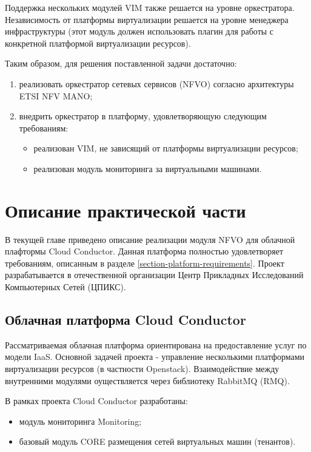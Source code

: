 \documentclass[oneside,final,14pt,a4paper]{extreport}
\begin{document}
Поддержка нескольких модулей VIM также решается на уровне оркестратора. Независимость от платформы виртуализации решается на уровне менеджера инфраструктуры (этот модуль должен использовать плагин для работы с конкретной платформой виртуализации ресурсов).

Таким образом, для решения поставленной задачи достаточно:
\begin{enumerate}
	\item реализовать оркестратор сетевых сервисов (NFVO) согласно архитектуры ETSI NFV MANO;
	\item внедрить оркестратор в платформу, удовлетворяющую следующим требованиям:
	\begin{itemize}
		\item реализован VIM, не зависящий от платформы виртуализации ресурсов;
		\item реализован модуль мониторинга за виртуальными машинами.
	\end{itemize}
\end{enumerate}





\chapter{Описание практической части}
В текущей главе приведено описание реализации модуля NFVO для облачной плафтормы Cloud Conductor. Данная платформа полностью удовлетворяет требованиям, описанным в разделе \ref{section-platform-requirements}. Проект разрабатывается в отечественной организации Центр Прикладных Исследований Компьютерных Сетей (ЦПИКС).

\section{Облачная платформа Cloud Conductor}
Рассматриваемая облачная платформа ориентирована на предоставление услуг по модели IaaS. Основной задачей проекта - управление несколькими платформами виртуализации ресурсов (в частности Openstack). Взаимодействие между внутренними модулями оуществляется через библиотеку RabbitMQ (RMQ).

В рамках проекта Cloud Conductor разработаны:
\begin{itemize}
	\item модуль мониторинга Monitoring;
	\item базовый модуль CORE размещения сетей виртуальных машин (тенантов).
\end{itemize}
\end{document}
